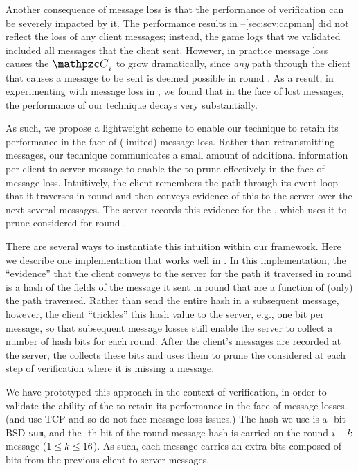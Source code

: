 Another consequence of message loss is that the performance of
verification can be severely impacted by it.  The performance results
in --\ref{sec:scv:capman} did not reflect the loss of
any client messages; instead, the game logs that we validated included
all messages that the client sent.  However, in practice message loss
causes the \execpathcons $\execPathConstraints_{\roundidx}$
to grow dramatically, since {\em any} path through the client that
causes a message to be sent is deemed possible in round \roundidx.  As
a result, in experimenting with message loss in \xpilot, we found that
in the face of lost messages, the performance of our technique decays
very substantially.

As such, we propose a lightweight scheme to enable our technique to
retain its performance in the face of (limited) message loss.  Rather
than retransmitting messages, our technique communicates a small
amount of additional information per client-to-server message to
enable the \verifier to prune \execpathcons effectively in the face of
message loss.  Intuitively, the client remembers the path through its
event loop that it traverses in round \roundidx and then conveys
evidence of this to the server over the next several messages.  The
server records this evidence for the \verifier, which uses it to prune
\pathsegcons considered for round \roundidx.

There are several ways to instantiate this intuition within our
framework.  Here we describe one implementation that works well in
\xpilot.  In this implementation, the ``evidence'' that the client
conveys to the server for the path it traversed in round
\roundidx is a hash of the fields of the message it sent in round
\roundidx that are a function of (only) the path traversed.
Rather than send the entire hash in a subsequent message, however, the
client ``trickles'' this hash value to the server, e.g., one bit per
message, so that subsequent message losses still enable the server to
collect a number of hash bits for each round.  After the client's
messages are recorded at the server, the \verifier collects these bits
and uses them to prune the \pathsegcons considered at each step of
verification where it is missing a message.

We have prototyped this approach in the context of \lazy verification,
in order to validate the ability of the \xpilot \verifier to retain
its performance in the face of message losses.  (\capman and \tetrinet
use TCP and so do not face message-loss issues.)  The hash we use is a
\hashsize-bit BSD \texttt{sum}, and the \bitidx-th bit of the
round-\roundidx message hash is carried on the round
$i+k$ message ($1 \le k \le 16$).  As such,
each message carries an extra \hashsize bits composed of bits from the
previous \hashsize client-to-server messages.

